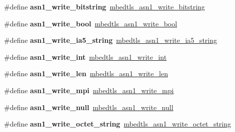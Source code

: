 \begin{DoxyCompactItemize}
\#define {\bfseries asn1\+\_\+write\+\_\+bitstring}~\mbox{\hyperlink{asn1write_8h_a3198221d6169d22d72e6a166043f40c5}{mbedtls\+\_\+asn1\+\_\+write\+\_\+bitstring}}
\item 
\mbox{\label{compat-1_83_8h_a2cc44d9f5be4e5bf4a2fb5e043c986da}} 
\#define {\bfseries asn1\+\_\+write\+\_\+bool}~\mbox{\hyperlink{asn1write_8h_adfc6b0a6111a9fe9b586c2a931e3e205}{mbedtls\+\_\+asn1\+\_\+write\+\_\+bool}}
\item 
\mbox{\label{compat-1_83_8h_aafe93b21c8bf73d69e40fa17afb0b745}} 
\#define {\bfseries asn1\+\_\+write\+\_\+ia5\+\_\+string}~\mbox{\hyperlink{asn1write_8h_af3bfd68158c26618239a733986b11528}{mbedtls\+\_\+asn1\+\_\+write\+\_\+ia5\+\_\+string}}
\item 
\mbox{\label{compat-1_83_8h_a6e22278f6ff0629a5cd1b7169588d171}} 
\#define {\bfseries asn1\+\_\+write\+\_\+int}~\mbox{\hyperlink{asn1write_8h_a6c5e6e927a74d85aea15866fb50e63c8}{mbedtls\+\_\+asn1\+\_\+write\+\_\+int}}
\item 
\mbox{\label{compat-1_83_8h_a30b7b8024c3d15291be012d07a224c4f}} 
\#define {\bfseries asn1\+\_\+write\+\_\+len}~\mbox{\hyperlink{asn1write_8h_a7fe6f4cdba05081bff484a7b286108df}{mbedtls\+\_\+asn1\+\_\+write\+\_\+len}}
\item 
\mbox{\label{compat-1_83_8h_ae8564c81ce773a6b5978e6baccb5c488}} 
\#define {\bfseries asn1\+\_\+write\+\_\+mpi}~\mbox{\hyperlink{asn1write_8h_ac2639a2da5918931152dd1ee1a93e7c9}{mbedtls\+\_\+asn1\+\_\+write\+\_\+mpi}}
\item 
\mbox{\label{compat-1_83_8h_ab56aa049f9173c3cafbaaa9984bd2206}} 
\#define {\bfseries asn1\+\_\+write\+\_\+null}~\mbox{\hyperlink{asn1write_8h_adc9614b64c7bb92e1d159898b23acd90}{mbedtls\+\_\+asn1\+\_\+write\+\_\+null}}
\item 
\mbox{\label{compat-1_83_8h_a6db330a3f5cadfd36a618fbddabbabb4}} 
\#define {\bfseries asn1\+\_\+write\+\_\+octet\+\_\+string}~\mbox{\hyperlink{asn1write_8h_a56e71582d7ccef976c09c49f9370e81b}{mbedtls\+\_\+asn1\+\_\+write\+\_\+octet\+\_\+string}}
\item 
\mbox{\label{compat-1_83_8h_a2500a2c904db615c5cfd1903c4945a7b}} 

\end{DoxyCompactItemize}
